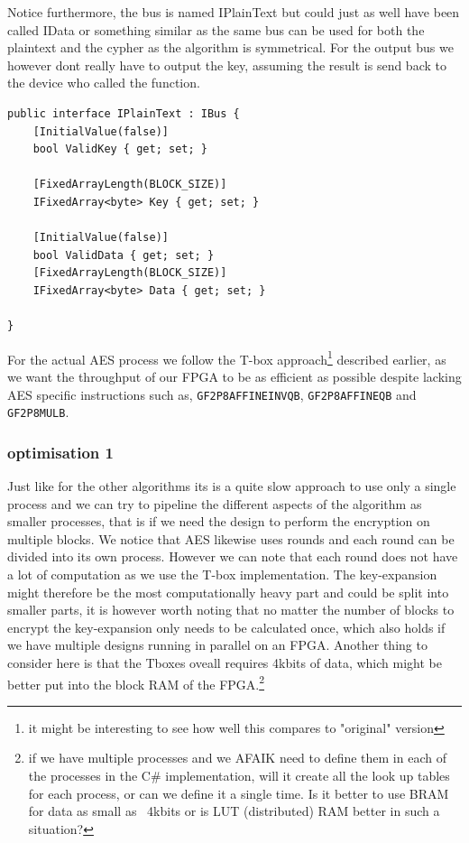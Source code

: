 \documentclass[a4paper]{article}
\begin{document}
Notice furthermore, the bus is named IPlainText but could just as well have been called IData or something similar as the same bus can be used for both the plaintext and the cypher as the algorithm is symmetrical. For the output bus we however dont really have to output the key, assuming the result is send back to the device who called the function.
\begin{verbatim}
public interface IPlainText : IBus {
    [InitialValue(false)]
    bool ValidKey { get; set; }

    [FixedArrayLength(BLOCK_SIZE)]
    IFixedArray<byte> Key { get; set; }

    [InitialValue(false)]
    bool ValidData { get; set; }
    [FixedArrayLength(BLOCK_SIZE)]
    IFixedArray<byte> Data { get; set; }

}
\end{verbatim}
For the actual AES process we follow the T-box approach\footnote{it might be interesting to see how well this compares to "original" version} described earlier, as we want the throughput of our FPGA to be as efficient as possible despite lacking AES specific instructions such as, \texttt{GF2P8AFFINEINVQB}, \texttt{GF2P8AFFINEQB} and \texttt{GF2P8MULB}.
\subsubsection{optimisation 1}
\label{AESopt}
Just like for the other algorithms its is a quite slow approach to use only a single process and we can try to pipeline the different aspects of the algorithm as smaller processes, that is if we need the design to perform the encryption on multiple blocks. We notice that AES likewise uses rounds and each round can be divided into its own process. However we can note that each round does not have a lot of computation as we use the T-box implementation. The key-expansion might therefore be the most computationally heavy part and could be split into smaller parts, it is however worth noting that no matter the number of blocks to encrypt the key-expansion only needs to be calculated once, which also holds if we have multiple designs running in parallel on an FPGA. Another thing to consider here is that the Tboxes oveall requires 4kbits of data, which might be better put into the block RAM of the FPGA.\footnote{if we have multiple processes and we AFAIK need to define them in each of the processes in the C# implementation, will it create all the look up tables for each process, or can we define it a single time. Is it better to use BRAM for data as small as ~4kbits or is LUT (distributed) RAM better in such a situation?}
\end{document}
